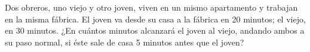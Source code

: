 Dos obreros, uno viejo y otro joven, viven en un mismo apartamento y trabajan en la misma fábrica. El joven va desde su casa a la fábrica en 20 minutos; el viejo, en 30 minutos. ¿En cuántos minutos alcanzará el joven al viejo, andando ambos a su paso normal, si éste sale de casa 5 minutos antes que el joven?
